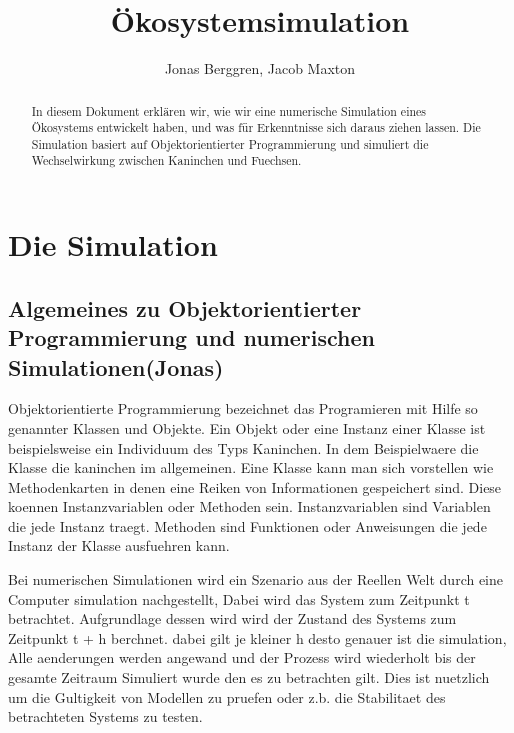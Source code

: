 \documentclass[12pt]{article}
\author{{\Large Jonas Berggren, Jacob Maxton}}
\title{{\myfont Ökosystemsimulation}}
\begin{document}
\maketitle
\begin{abstract}
In diesem Dokument erklären wir, wie wir eine numerische Simulation eines
	Ökosystems entwickelt haben, und was für Erkenntnisse sich daraus ziehen lassen.
Die Simulation basiert auf Objektorientierter Programmierung und simuliert die Wechselwirkung zwischen Kaninchen und Fuechsen.
\end{abstract}
\tableofcontents
\newpage
\section{Die Simulation}
 \subsection{Algemeines zu Objektorientierter Programmierung und numerischen Simulationen(Jonas)}
Objektorientierte Programmierung bezeichnet das Programieren mit Hilfe so genannter Klassen und Objekte.
Ein Objekt oder eine Instanz einer Klasse ist beispielsweise ein Individuum des Typs Kaninchen.
In dem Beispielwaere die Klasse die kaninchen im allgemeinen.
Eine Klasse kann man sich vorstellen wie Methodenkarten in denen eine Reiken von Informationen gespeichert sind.
Diese koennen Instanzvariablen oder Methoden sein.
Instanzvariablen sind Variablen die jede Instanz traegt.
Methoden sind Funktionen oder Anweisungen die jede Instanz der Klasse ausfuehren kann.

Bei numerischen Simulationen wird ein Szenario aus der Reellen Welt durch eine Computer simulation nachgestellt,
Dabei wird das System zum Zeitpunkt t betrachtet.
Aufgrundlage dessen wird wird der Zustand des Systems zum Zeitpunkt t + h berchnet.
dabei gilt je kleiner h desto genauer ist die simulation,
Alle aenderungen werden angewand und der Prozess wird wiederholt bis der gesamte Zeitraum Simuliert wurde den es zu betrachten gilt.
Dies ist nuetzlich um die Gultigkeit von Modellen zu pruefen oder z.b. die Stabilitaet des betrachteten Systems zu testen.
\end{document}
